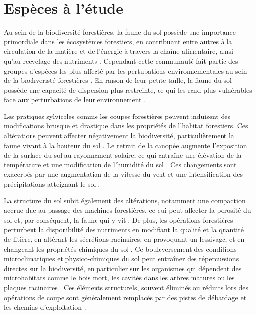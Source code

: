 \section*{Espèces à l'étude}
\label{sec:species}

Au sein de la biodiversité forestières, la faune du sol possède une importance primordiale dans les écosystèmes forestiers, en contribuant entre autres à la circulation de la matière et de l'énergie à travers la chaîne alimentaire, ainsi qu'au recyclage des nutriments \citep{Seibold2021contributioninsects,Kudrin2023metaanalysiseffects}.
Cependant cette communauté fait partie des groupes d'espèces les plus affecté par les pertubations environnementales au sein de la biodiveristé forestières \citep{Marshall2000Impactsforest,Coyle2017Soilfauna}. 
En raison de leur petite taille, la faune du sol possède une capacité de dispersion plus restreinte, ce qui les rend plus vulnérables face aux perturbations de leur environnement \citep{Kudrin2023metaanalysiseffects}.

Les pratiques sylvicoles comme les coupes forestières peuvent induisent des modifications brusque et drastique dans les propriétés de l'habitat forestiers. 
Ces altérations peuvent affecter négativement la biodiversité, particulièrement la faune vivant à la hauteur du sol \citep{Lindo2003Microbialbiomass,Paillet2010Biodiversitydifferences,Fedrowitz2014Canretention,Chaudhary2016Impactforest}. 
Le retrait de la canopée augmente l'exposition de la surface du sol au rayonnement solaire, ce qui entraîne une élévation de la température et une modification de l'humidité du sol \citep{Lindo2003Microbialbiomass,Brook2008Synergiesextinction,Zhang2022Intensiveforest}. 
Ces changements sont exacerbés par une augmentation de la vitesse du vent et une intensification des précipitations atteignant le sol \citep{Keenan1993ecologicaleffects,Heithecker2007Edgerelatedgradients}. 

La structure du sol subit également des altérations, notamment une compaction accrue due au passage des machines forestières, ce qui peut affecter la porosité du sol et, par conséquent, la faune qui y vit \citep{Battigelli2004Shorttermimpact,Mazerolle2021Woodlandsalamander}. 
De plus, les opérations forestières perturbent la disponibilité des nutriments en modifiant la qualité et la quantité de litière, en altérant les sécrétions racinaires, en provoquant un lessivage, et en changeant les propriétés chimiques du sol \citep{Covington1981Changesforest,Marshall2000Impactsforest,Lindo2003Microbialbiomass,Battigelli2004Shorttermimpact}. 
Ce bouleversement des conditions microclimatiques et physico-chimiques du sol peut entraîner des répercussions directes sur la biodiversité, 
en particulier sur les organismes qui dépendent des microhabitats comme le bois mort, les cavités dans les arbres matures ou les plaques racinaires \citep{Berg1994ThreatenedPlant,Spies1999Dynamicforest,Bouget2005Shorttermeffect,Christensen2005Deadwood,Brassard2008EffectsForest}.
Ces éléments structurels, souvent éliminés ou réduits lors des opérations de coupe sont généralement remplacés par des pistes de débardage et les chemins d'exploitation \citep{Hansen1991ConservingBiodiversity}. 

